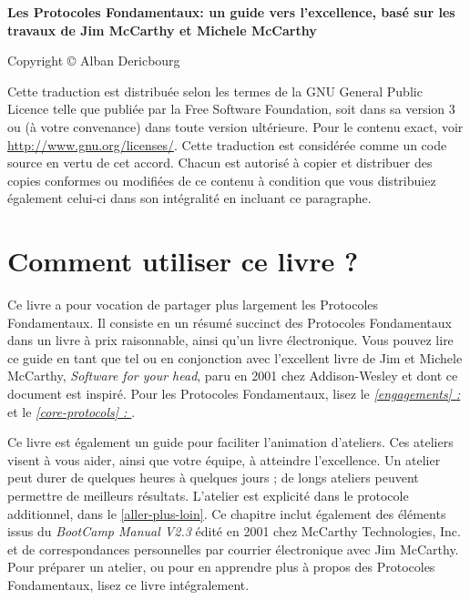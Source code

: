 \documentclass[paper=6in:9in,pagesize=pdftex,headinclude=on,footinclude=on,11pt]{scrbook}
\newcommand*{\numref}[1]{{\hyperref[{#1}]{\autoref*{#1}}}}
\newcommand*{\fullref}[1]{\textit{\hyperref[{#1}]{\autoref*{#1} : \nameref*{#1}}}}
\begin{document}
\begin{samepage}
	\noindent \textbf{Les Protocoles Fondamentaux: un guide vers l'excellence, basé sur les travaux de Jim McCarthy et Michele McCarthy}

	\noindent Copyright \copyright{} Alban Dericbourg

	\noindent Cette traduction est distribuée selon les termes de la GNU General Public Licence telle que publiée par la Free Software
	Foundation, soit dans sa version 3 ou (à votre convenance) dans toute version ultérieure. Pour le contenu exact, voir
	\url{http://www.gnu.org/licenses/}. Cette traduction est considérée comme un code source en vertu de cet accord. Chacun est autorisé
	à copier et distribuer des copies conformes ou modifiées de ce contenu à condition que vous distribuiez également celui-ci
	dans son intégralité en incluant ce paragraphe.
\end{samepage}

\mainmatter

\chapter{Comment utiliser ce livre ?} \label{utiliser-ce-livre}

Ce livre a pour vocation de partager plus largement les Protocoles Fondamentaux. Il consiste en un résumé succinct des
Protocoles Fondamentaux dans un livre à prix raisonnable, ainsi qu'un livre électronique. Vous pouvez lire ce guide en tant que
tel ou en conjonction avec l'excellent livre de Jim et Michele McCarthy, \emph{Software for your head}, paru en 2001
chez Addison-Wesley et dont ce document est inspiré. Pour les Protocoles Fondamentaux, lisez le \fullref{engagements}
et le \fullref{core-protocols}.

Ce livre est également un guide pour faciliter l'animation d'ateliers. Ces ateliers visent à vous aider, ainsi que
votre équipe, à atteindre l'excellence. Un atelier peut durer de quelques heures à quelques jours ; de longs ateliers
peuvent permettre de meilleurs résultats. L'atelier est explicité dans le protocole additionnel, 
dans le \numref{aller-plus-loin}. Ce chapitre inclut également des éléments issus du \emph{BootCamp Manual V2.3} édité en
2001 chez McCarthy Technologies, Inc. et de correspondances personnelles par courrier électronique avec Jim McCarthy. Pour
préparer un atelier, ou pour en apprendre plus à propos des Protocoles Fondamentaux, lisez ce livre intégralement.
\end{document}
